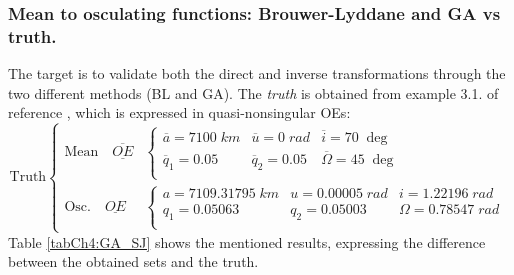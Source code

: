 		\subsubsection{Mean to osculating functions: Brouwer-Lyddane and GA vs truth.}
		\indent The target is to validate both the direct and inverse transformations through the two different methods (BL and GA). The \textit{truth} is obtained from example 3.1. of reference \cite{SCFormationFlying}, which is expressed in quasi-nonsingular OEs:
		\begin{equation}
		\text{Truth} \left\{ \begin{array}{ll}
		\text{Mean} \quad \underline{\overline{OE}} & \left\{\begin{array}{ccc}
		\overline{a} = 7100 \; km 	& \overline{u} = 0 \; rad 	& \overline{i} 		= 70 \; \deg 	\\
		\overline{q}_1 = 0.05		& \overline{q}_2 = 0.05  	& \overline{\Omega} = 45 \; \deg 	\\  
		\end{array}\right. \\
		\text{Osc.} \quad \underline{OE} & \left\{\begin{array}{ccc}
		a = 7109.31795 \; km 	& u = 0.00005 \; rad 	& i 		= 1.22196 \; rad 	\\
		q_1 = 0.05063		& q_2 = 0.05003  	& \Omega = 0.78547 \; rad 	\\  
		\end{array}\right.
		\end{array}\right.
		\label{eqCh4:Scenarios_m2o}
		\end{equation}
		\indent Table \ref{tabCh4:GA_SJ} shows the mentioned results, expressing the difference between the obtained sets and the truth.
